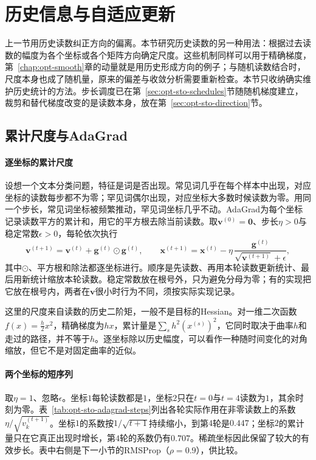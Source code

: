 \section{历史信息与自适应更新}
\label{sec:opt-sto-adaptive}

上一节用历史读数纠正方向的偏离。本节研究历史读数的另一种用法：根据过去读数的幅度为各个坐标或各个矩阵方向确定尺度。这些机制同样可以用于精确梯度，第~\ref{chap:opt-smooth}章的动量就是用历史形成方向的例子；与随机读数结合时，尺度本身也成了随机量，原来的偏差与收敛分析需要重新检查。本节只收纳确实维护历史统计的方法。步长调度已在第~\ref{sec:opt-sto-schedules}节随随机梯度建立，裁剪和替代梯度改变的是读数本身，放在第~\ref{sec:opt-sto-direction}节。

\subsection{累计尺度与AdaGrad}
\label{sec:opt-sto-adagrad}

\paragraph{逐坐标的累计尺度}
设想一个文本分类问题，特征是词是否出现。常见词几乎在每个样本中出现，对应坐标的读数每步都不为零；罕见词偶尔出现，对应坐标大多数时候读数为零。用同一个步长，常见词坐标被频繁推动，罕见词坐标几乎不动。AdaGrad为每个坐标记录读数平方的累计和，用它的平方根去除当前读数。取$\bm v^{(0)}=\bm0$、步长$\eta>0$与稳定常数$\epsilon>0$，每轮依次执行
\begin{equation}
\label{eq:opt-sto-adagrad}
  \bm v^{(t+1)}=\bm v^{(t)}+\bm g^{(t)}\odot\bm g^{(t)},\qquad
  \bm x^{(t+1)}=\bm x^{(t)}-\eta\,\frac{\bm g^{(t)}}{\sqrt{\bm v^{(t+1)}}+\epsilon},
\end{equation}
其中$\odot$、平方根和除法都逐坐标进行。顺序是先读数、再用本轮读数更新统计、最后用新统计缩放本轮读数。稳定常数放在根号外，只为避免分母为零；有的实现把它放在根号内，两者在$\bm v$很小时行为不同，须按实际实现记录。

这里的尺度来自读数的历史二阶矩，一般不是目标的Hessian。对一维二次函数$f(x)=\tfrac h2x^2$，精确梯度为$hx$，累计量是$\sum_sh^2(x^{(s)})^2$，它同时取决于曲率$h$和走过的路径，并不等于$h$。逐坐标除以历史幅度，可以看作一种随时间变化的对角缩放，但它不是对固定曲率的近似。

\paragraph{两个坐标的短序列}
取$\eta=1$、忽略$\epsilon$。坐标$1$每轮读数都是$1$，坐标$2$只在$t=0$与$t=4$读数为$1$，其余时刻为零。表~\ref{tab:opt-sto-adagrad-steps}列出各轮实际作用在非零读数上的系数$\eta/\sqrt{v_k^{(t+1)}}$。坐标$1$的系数按$1/\sqrt{t+1}$持续缩小，到第$4$轮是$0.447$；坐标$2$的累计量只在它真正出现时增长，第$4$轮的系数仍有$0.707$。稀疏坐标因此保留了较大的有效步长。表中右侧是下一小节的RMSProp（$\rho=0.9$），供比较。

